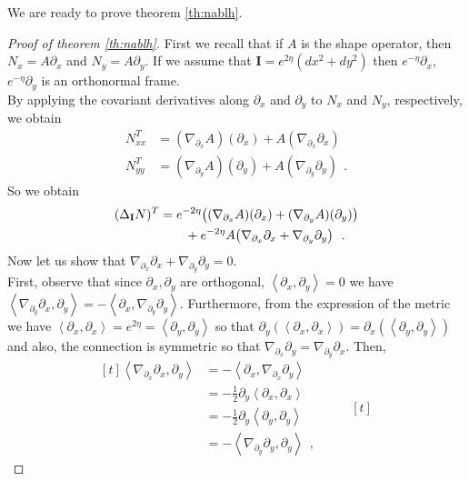 \documentclass[a4paper,11pt,openright,twoside]{book}
\newcommand{\I}{\mathbf{I}}
\newcommand{\1}{\mathds{1}}
\theoremstyle{plain}
\theoremstyle{definition}
\theoremstyle{remark}
\begin{document}
We are ready to prove theorem \ref{th:nablh}.
\begin{proof}[Proof of theorem \ref{th:nablh}]
	First we recall that if $A$ is the shape operator, then $N_x = A\partial_x$ and $N_y= A\partial_y$. If we assume that $\I = e^{2\eta}(dx^2+dy^2)$ then $e^{-\eta}\partial_x$, $e^{-\eta}\partial_y$ is an orthonormal frame.\\
	By applying the covariant derivatives along $\partial_x$ and $\partial_y$ to $N_x$ and $N_y$, respectively, we obtain
	\begin{align*}
		N_{xx}^T &= (\nabla_{\partial_x} A) (\partial_x) + A(\nabla_{\partial_x}\partial_x)\\
		N_{yy}^T &= (\nabla_{\partial_y}A) (\partial_y) + A(\nabla_{\partial_y}\partial_y)
	\ \ . 
	\end{align*}
	So we obtain
	\begin{align}\label{eq:nablh1}
	(\Delta_\I N)^T
	&=
	e^{-2\eta}\bigl((\nabla_{\partial_x}A)(\partial_x)+(\nabla_{\partial_y}A)(\partial_y)\bigr) \notag\\
	&\qquad + e^{-2\eta}A\bigl(\nabla_{\partial_x}\partial_x+\nabla_{\partial_y}\partial_y\bigr)
	\ \ .
	\end{align}
	Now let us show that $\nabla_{\partial_x}\partial_x + \nabla_{\partial_y}\partial_y = 0$.\\
	First, observe that since $\partial_x,\partial_y$ are orthogonal, $\left<\partial_x,\partial_y \right> = 0$ we have $\left<\nabla_{\partial_y}\partial_x,\partial_y \right> = - \left<\partial_x, \nabla_{\partial_y}\partial_y \right>$. Furthermore, from the expression of the metric we have $\left<\partial_x, \partial_x \right> = e^{2\eta} = \left<\partial_y,\partial_y \right>$ so that $\partial_y(\left<\partial_x,\partial_x \right>) = \partial_x(\left<\partial_y,\partial_y \right>)$ and also, the connection is symmetric so that $\nabla_{\partial_x} \partial_y = \nabla_{\partial_y} \partial_x$. Then,	
	\[
	\begin{aligned}[t]
	\left< \nabla_{\partial_x} \partial_x, \partial_y\right>
	&= -\left<\partial_x, \nabla_{\partial_x}\partial_y \right>\\
	&= -\frac{1}{2}\partial_y\left<\partial_x,\partial_x \right> \\
	&= -\frac{1}{2}\partial_y\left<\partial_y,\partial_y \right> \\
	&= -\left<\nabla_{\partial_y}\partial_y, \partial_y \right>
	\ \ ,
	\end{aligned}
	\qquad
	\begin{aligned}[t]

\end{aligned}\]
\end{proof}
\end{document}

